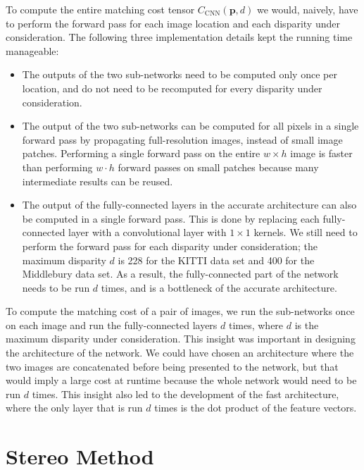 \documentclass[twoside,11pt]{article}
\begin{document}
To compute the entire matching cost tensor \(
C_{\text{CNN}}(\mathbf{p}, d) \) we would, naively, have to perform the forward
pass for each image location and each disparity under consideration. The
following three implementation details kept the running time manageable:
%
\begin{itemize}
\item The outputs of the two sub-networks need to be computed only once per
location, and do not need to be recomputed for every disparity under
consideration.

\item The output of the two sub-networks can be computed for all pixels in a
single forward pass by propagating full-resolution images, instead of small
image patches. Performing a single forward pass on the entire $w \times h$
image is faster than performing $w \cdot h$ forward passes on small patches
because many intermediate results can be reused.

\item The output of the fully-connected layers in the accurate architecture can
also be computed in a single forward pass. This is done by replacing each
fully-connected layer with a convolutional layer with \(1 \times 1\) kernels.
We still need to perform the forward pass for each disparity under
consideration; the maximum disparity $d$ is 228 for the KITTI data set and 400
for the Middlebury data set. As a result, the fully-connected part of the
network needs to be run \(d\) times, and is a bottleneck of the accurate
architecture.

\end{itemize}
%
To compute the matching cost of a pair of images, we run the sub-networks once
on each image and run the fully-connected layers $d$ times, where $d$ is the
maximum disparity under consideration. This insight was important in designing
the architecture of the network. We could have chosen an architecture where the
two images are concatenated before being presented to the network, but that
would imply a large cost at runtime because the whole network would need to be
run $d$ times. This insight also led to the development  of the fast
architecture, where the only layer that is run $d$ times is the dot product of
the feature vectors.

\section{Stereo Method}
\label{sec:stereo_method}
\end{document}
